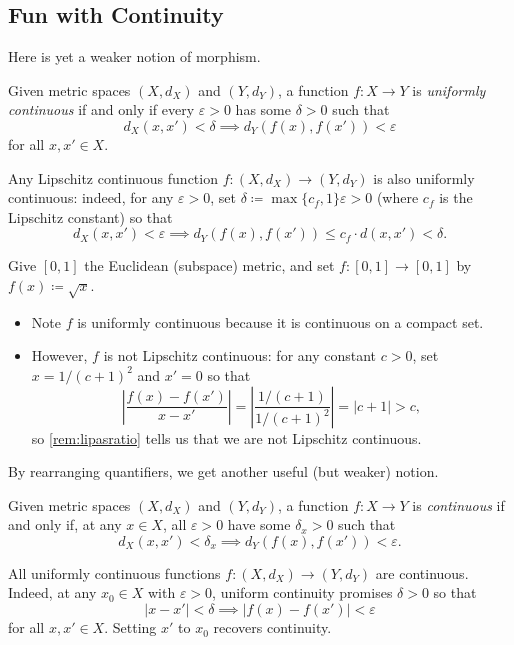 \documentclass[../notes.tex]{subfiles}
\begin{document}
\subsection{Fun with Continuity}
Here is yet a weaker notion of morphism.
\begin{definition}
	Given metric spaces $(X,d_X)$ and $(Y,d_Y)$, a function $f\colon X\to Y$ is \textit{uniformly continuous} if and only if every $\varepsilon>0$ has some $\delta>0$ such that
	\[d_X(x,x')<\delta\implies d_Y(f(x),f(x'))<\varepsilon\]
	for all $x,x'\in X$.
\end{definition}
\begin{example}
	Any Lipschitz continuous function $f\colon(X,d_X)\to(Y,d_Y)$ is also uniformly continuous: indeed, for any $\varepsilon>0$, set $\delta\coloneqq\max\{c_f,1\}\varepsilon>0$ (where $c_f$ is the Lipschitz constant) so that
	\[d_X(x,x')<\varepsilon\implies d_Y(f(x),f(x'))\le c_f\cdot d(x,x')<\delta.\]
\end{example}
\begin{example}
	Give $[0,1]$ the Euclidean (subspace) metric, and set $f\colon[0,1]\to[0,1]$ by $f(x)\coloneqq\sqrt x$.
	\begin{itemize}
		\item Note $f$ is uniformly continuous because it is continuous on a compact set.
		\item However, $f$ is not Lipschitz continuous: for any constant $c>0$, set $x=1/(c+1)^2$ and $x'=0$ so that
		\[\left|\frac{f(x)-f(x')}{x-x'}\right|=\left|\frac{1/(c+1)}{1/(c+1)^2}\right|=|c+1|>c,\]
		so \autoref{rem:lipasratio} tells us that we are not Lipschitz continuous.
	\end{itemize}
\end{example}
By rearranging quantifiers, we get another useful (but weaker) notion.
\begin{definition}[Continuous]
	Given metric spaces $(X,d_X)$ and $(Y,d_Y)$, a function $f\colon X\to Y$ is \textit{continuous} if and only if, at any $x\in X$, all $\varepsilon>0$ have some $\delta_x>0$ such that
	\[d_X(x,x')<\delta_x\implies d_Y(f(x),f(x'))<\varepsilon.\]
\end{definition}
\begin{example}
	All uniformly continuous functions $f\colon(X,d_X)\to(Y,d_Y)$ are continuous. Indeed, at any $x_0\in X$ with $\varepsilon>0$, uniform continuity promises $\delta>0$ so that
	\[|x-x'|<\delta\implies|f(x)-f(x')|<\varepsilon\]
	for all $x,x'\in X$. Setting $x'$ to $x_0$ recovers continuity.
\end{example}
\end{document}
